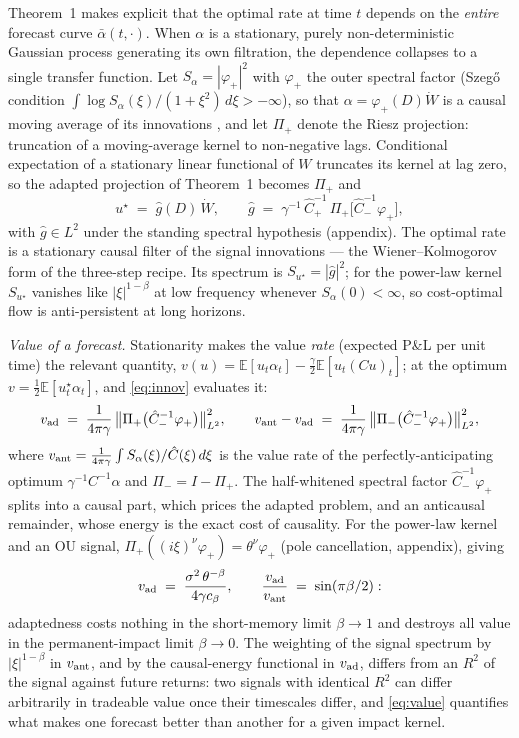 \documentclass[11pt]{article}
\newcommand{\E}{\mathbb{E}}
\theoremstyle{plain}
\begin{document}
Theorem~1 makes explicit that the optimal rate at time $t$ depends on the \emph{entire} forecast curve $\bar\alpha(t,\cdot)$. When $\alpha$ is a stationary, purely non-deterministic Gaussian process generating its own filtration, the dependence collapses to a single transfer function. Let $S_\alpha = |\varphi_+|^2$ with $\varphi_+$ the outer spectral factor (Szeg\H{o} condition $\int\log S_\alpha(\xi)/(1+\xi^2)\,d\xi>-\infty$), so that $\alpha = \varphi_+(D)\dot W$ is a causal moving average of its innovations \citep{Wiener1949}, and let $\Pi_+$ denote the Riesz projection: truncation of a moving-average kernel to non-negative lags. Conditional expectation of a stationary linear functional of $W$ truncates its kernel at lag zero, so the adapted projection of Theorem~1 becomes $\Pi_+$ and
\begin{equation}\label{eq:innov}
u^\star \;=\; \hat g(D)\,\dot W, \qquad \hat g \;=\; \gamma^{-1}\,\hat C_+^{-1}\,\Pi_+\!\bigl[\hat C_-^{-1}\varphi_+\bigr],
\end{equation}
with $\hat g\in L^2$ under the standing spectral hypothesis (appendix). The optimal rate is a stationary causal filter of the signal innovations --- the Wiener--Kolmogorov form of the three-step recipe. Its spectrum is $S_{u^\star} = |\hat g|^2$; for the power-law kernel $S_{u^\star}$ vanishes like $|\xi|^{1-\beta}$ at low frequency whenever $S_\alpha(0)<\infty$, so cost-optimal flow is anti-persistent at long horizons.

\emph{Value of a forecast.} Stationarity makes the value \emph{rate} (expected P\&L per unit time) the relevant quantity, $v(u) = \E[u_t\alpha_t] - \tfrac{\gamma}{2}\E[u_t(Cu)_t]$; at the optimum $v = \tfrac12\E[u^\star_t\alpha_t]$, and \eqref{eq:innov} evaluates it:
\begin{equation}\label{eq:value}
v_{\rm ad} \;=\; \frac{1}{4\pi\gamma}\,\bigl\|\Pi_+\bigl(\hat C_-^{-1}\varphi_+\bigr)\bigr\|_{L^2}^2, \qquad v_{\rm ant} - v_{\rm ad} \;=\; \frac{1}{4\pi\gamma}\,\bigl\|\Pi_-\bigl(\hat C_-^{-1}\varphi_+\bigr)\bigr\|_{L^2}^2,
\end{equation}
where $v_{\rm ant} = \frac{1}{4\pi\gamma}\int S_\alpha(\xi)/\hat C(\xi)\,d\xi$ is the value rate of the perfectly-anticipating optimum $\gamma^{-1}C^{-1}\alpha$ and $\Pi_- = I-\Pi_+$. The half-whitened spectral factor $\hat C_-^{-1}\varphi_+$ splits into a causal part, which prices the adapted problem, and an anticausal remainder, whose energy is the exact cost of causality. For the power-law kernel and an OU signal, $\Pi_+((i\xi)^\nu\varphi_+) = \theta^\nu\varphi_+$ (pole cancellation, appendix), giving
\[
v_{\rm ad} \;=\; \frac{\sigma^2\,\theta^{-\beta}}{4\gamma c_\beta}, \qquad \frac{v_{\rm ad}}{v_{\rm ant}} \;=\; \sin(\pi\beta/2):
\]
adaptedness costs nothing in the short-memory limit $\beta\to1$ and destroys all value in the permanent-impact limit $\beta\to0$. The weighting of the signal spectrum by $|\xi|^{1-\beta}$ in $v_{\rm ant}$, and by the causal-energy functional in $v_{\rm ad}$, differs from an $R^2$ of the signal against future returns: two signals with identical $R^2$ can differ arbitrarily in tradeable value once their timescales differ, and \eqref{eq:value} quantifies what makes one forecast better than another for a given impact kernel.
\end{document}
